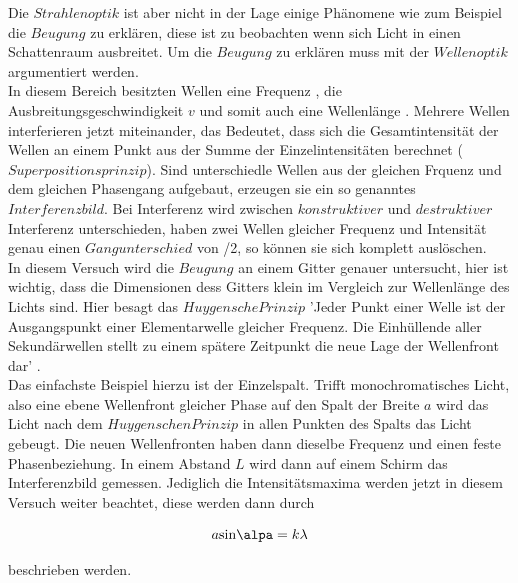         \noindent Die $Strahlenoptik$ ist aber nicht in der Lage einige Phänomene wie zum Beispiel die $Beugung$ zu erklären, diese ist zu 
        beobachten wenn sich Licht in einen Schattenraum ausbreitet. Um die $Beugung$ zu erklären muss mit der $Wellenoptik$ argumentiert werden.\\
        In diesem Bereich besitzten Wellen eine Frequenz \nu, die Ausbreitungsgeschwindigkeit $v$ und somit auch eine Wellenlänge \lambda.
        Mehrere Wellen interferieren jetzt miteinander, das Bedeutet, dass sich die Gesamtintensität der Wellen an einem Punkt aus der Summe der 
        Einzelintensitäten berechnet ($Superpositionsprinzip$). Sind unterschiedle Wellen aus der gleichen Frquenz und dem gleichen Phasengang 
        aufgebaut, erzeugen sie ein so genanntes $Interferenzbild$. Bei Interferenz wird zwischen $konstruktiver$ und $destruktiver$ Interferenz 
        unterschieden, haben zwei Wellen gleicher Frequenz und Intensität genau einen $Gangunterschied$ von \lambda/2, so können sie sich 
        komplett auslöschen.\\
        In diesem Versuch wird die $Beugung$ an einem Gitter genauer untersucht, hier ist wichtig, dass die Dimensionen dess Gitters klein im 
        Vergleich zur Wellenlänge des Lichts sind. Hier besagt das $Huygensche Prinzip$ 'Jeder Punkt einer Welle ist der Ausgangspunkt einer 
        Elementarwelle gleicher Frequenz. Die Einhüllende aller Sekundärwellen stellt zu einem spätere Zeitpunkt die neue Lage der Wellenfront
        dar' \cite{400}.\\
        Das einfachste Beispiel hierzu ist der Einzelspalt. Trifft monochromatisches Licht, also eine ebene Wellenfront gleicher Phase auf den 
        Spalt der Breite $a$ wird das Licht nach dem $Huygenschen Prinzip$ in allen Punkten des Spalts das Licht gebeugt. Die neuen Wellenfronten 
        haben dann dieselbe Frequenz und einen feste Phasenbeziehung. In einem Abstand $L$ wird dann auf einem Schirm das Interferenzbild gemessen. 
        Jediglich die Intensitätsmaxima werden jetzt in diesem Versuch weiter beachtet, diese werden dann durch 

        \begin{equation}
            a \text{sin} \alpa = k \lambda
        \end{equation}

        beschrieben werden. 